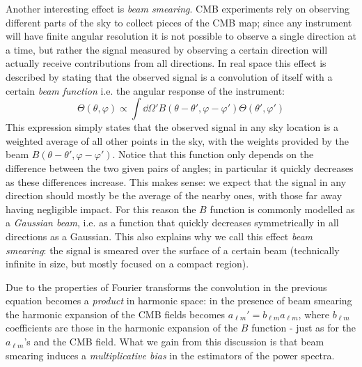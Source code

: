 Another interesting effect is \emph{beam smearing}. CMB experiments rely on observing different parts of the sky to collect pieces of the CMB map; since any instrument will have finite angular resolution it is not possible to observe a single direction at a time, but rather the signal measured by observing a certain direction will actually receive contributions from all directions.
In real space this effect is described by stating that the observed signal is a convolution of itself with a certain \emph{beam function} i.e. the angular response of the instrument:
\begin{equation*}
    \Theta(\theta, \varphi) \propto \int \dd{\Omega'} B(\theta-\theta', \varphi - \varphi') \Theta(\theta', \varphi')
\end{equation*}
This expression simply states that the observed signal in any sky location is a weighted average of all other points in the sky, with the weights provided by the beam $B(\theta-\theta', \varphi - \varphi')$. Notice that this function only depends on the difference between the two given pairs of angles; in particular it quickly decreases as these differences increase. This makes sense: we expect that the signal in any direction should mostly be the average of the nearby ones, with those far away having negligible impact. For this reason the $B$ function is commonly modelled as a \emph{Gaussian beam}, i.e. as a function that quickly decreases symmetrically in all directions as a Gaussian.
This also explains why we call this effect \emph{beam smearing}: the signal is smeared over the surface of a certain beam (technically infinite in size, but mostly focused on a compact region).

Due to the properties of Fourier transforms the convolution in the previous equation becomes a \emph{product} in harmonic space: in the presence of beam smearing the harmonic expansion of the CMB fields becomes $a_{\ell m}' = b_{\ell m} a_{\ell m}$, where $b_{\ell m}$ coefficients are those in the harmonic expansion of the $B$ function - just as for the $a_{\ell m}$'s and the CMB field.
What we gain from this discussion is that beam smearing induces a \emph{multiplicative bias} in the estimators of the power spectra.

